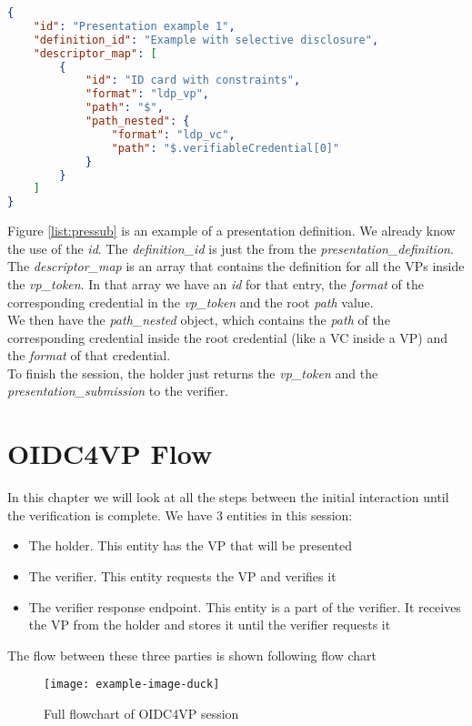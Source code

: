 \documentclass[
	a4paper               %
	,BCOR=0mm            %
	,bibliography=totoc   %
	,listof=totoc         %
	,monolingual
	,twoside=false
]{bfhthesis}              %
\begin{document}
\begin{lstlisting}[language=json,firstnumber=1,caption={Example of a presentation submission},captionpos=b, label={list:pressub}]
{
	"id": "Presentation example 1",
	"definition_id": "Example with selective disclosure",
	"descriptor_map": [
		{
			"id": "ID card with constraints",
			"format": "ldp_vp",
			"path": "$",
			"path_nested": {
				"format": "ldp_vc",
				"path": "$.verifiableCredential[0]"
			}
		}
	]
}
\end{lstlisting}

Figure \ref{list:pressub} is an example of a presentation definition. We already know the use of the \textit{id}. The \textit{definition\_id} is just the  from the \textit{presentation\_definition}.
The \textit{descriptor\_map} is an array that contains the definition for all the VPs inside the \textit{vp\_token}.
In that array we have an \textit{id} for that entry, the \textit{format} of the corresponding credential in the \textit{vp\_token} and the root \textit{path} value.\\
We then have the \textit{path\_nested} object, which contains the \textit{path} of the corresponding credential inside the root credential (like a VC inside a VP) and the   \textit{format} of that credential.\\

To finish the session, the holder just returns the \textit{vp\_token} and the \textit{presentation\_submission} to the verifier.

\section{OIDC4VP Flow}
In this chapter we will look at all the steps between the initial interaction until the verification is complete.
We have 3 entities in this session:
\begin{itemize}
	\item The holder. This entity has the VP that will be presented
	\item The verifier. This entity requests the VP and verifies it
	\item The verifier response endpoint. This entity is a part of the verifier. It receives the VP from the holder and stores it until the verifier requests it
\end{itemize}

The flow between these three parties is shown following flow chart
\begin{figure}[h]
	\centering
	\texttt{[image: example-image-duck]}
	\label{fig:flowoid}
	\caption{Full flowchart of OIDC4VP session}
\end{figure}
\end{document}
